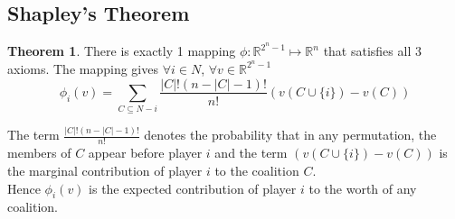 \documentclass{article}
\theoremstyle{definition}
\newtheorem{theorem}{Theorem}[section]
\begin{document}
\subsection{Shapley's Theorem}
\begin{theorem}
There is exactly 1 mapping $\phi: \mathbb{R}^{2^n -1} \mapsto \mathbb{R}^n$ that satisfies all 3 axioms. The mapping gives $\forall i \in N$, $\forall v \in \mathbb{R}^{2^n -1}$
$$\phi_i(v) = \sum_{C\subseteq N-i} \frac{|C|!(n-|C|-1)!}{n!}(v(C\cup \{i\}) - v(C))$$
\end{theorem}
The term $\displaystyle{\frac{|C|!(n-|C|-1)!}{n!}}$ denotes the probability that in any permutation, the members of $C$ appear before player $i$ and the term $(v(C\cup \{i\}) - v(C))$ is the marginal contribution of player $i$ to the coalition $C$.\\
Hence $\phi_i(v)$ is the expected contribution of player $i$ to the worth of any coalition.
\end{document}
